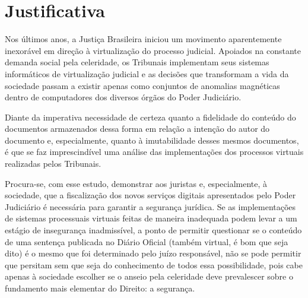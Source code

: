 \chapter{Justificativa}

	Nos últimos anos, a Justiça Brasileira iniciou um movimento aparentemente inexorável em direção à virtualização do processo judicial. Apoiados na constante demanda social pela celeridade, os Tribunais implementam seus sistemas informáticos de virtualização judicial e as decisões que transformam a vida da sociedade passam a existir apenas como conjuntos de anomalias magnéticas dentro de computadores dos diversos órgãos do Poder Judiciário.\par
	
	Diante da imperativa necessidade de certeza quanto a fidelidade do conteúdo do documentos armazenados dessa forma em relação a intenção do autor do documento e, especialmente, quanto à imutabilidade desses mesmos documentos, é que se faz imprescindível uma análise das implementações dos processos virtuais realizadas pelos Tribunais. \par
	
	Procura-se, com esse estudo, demonstrar aos juristas e, especialmente, à sociedade, que a fiscalização dos novos serviços digitais apresentados pelo Poder Judiciário é necessária para garantir a segurança jurídica. Se as implementações de sistemas processuais virtuais feitas de maneira inadequada podem levar a um estágio de insegurança inadmissível, a ponto de permitir questionar se o conteúdo de uma sentença publicada no Diário Oficial (também virtual, é bom que seja dito)  é o mesmo que foi determinado pelo juízo responsável, não se pode permitir que persitam sem que seja do conhecimento de todos essa possibilidade, pois cabe apenas à sociedade escolher se o anseio pela celeridade deve prevalescer sobre o fundamento mais elementar do Direito: a segurança.\par
